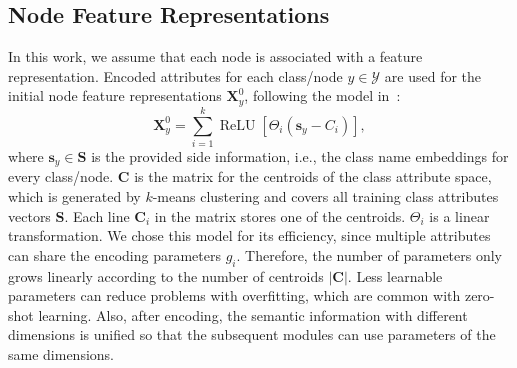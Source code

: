 \documentclass[letterpaper]{article}
\DeclareMathOperator*{\relu}{ReLU}
\def\vs{{\bm{s}}}
\def\mC{{\bm{C}}}
\def\mS{{\bm{S}}}
\def\mX{{\bm{X}}}
\begin{document}
\subsection{Node Feature Representations}
In this work, we assume that each node is associated with a feature representation. Encoded attributes for each class/node $y\in\mathcal{Y}$ are used for the initial node feature representations $\mX_{y}^{0}$, following the model in~\cite{zhang2019co}:
\begin{equation}\label{equ:preprocess}
\mX^{0}_{y}= \sum_{i=1}^{k} \relu[\Theta_{i}(\vs_y-C_{i})],
\end{equation}
where $\vs_{y} \in \mS$ is the provided side information, i.e., the class name embeddings for every class/node. $\mC$ is the matrix for the centroids of the class attribute space, which is generated by $k$-means clustering and covers all training class attributes vectors $\mS$. Each line $\mC_{i}$ in the matrix stores one of the centroids. $\Theta_i$ is a linear transformation. We chose this model for its  efficiency, since multiple attributes can share the encoding parameters $g_i$. Therefore, the number of parameters only grows linearly according to the number of centroids $|\mC|$. Less learnable parameters can reduce problems with overfitting, which are common with zero-shot learning. Also, after encoding, the semantic information with different dimensions is unified so that the subsequent modules can use parameters of the same dimensions.
\end{document}
